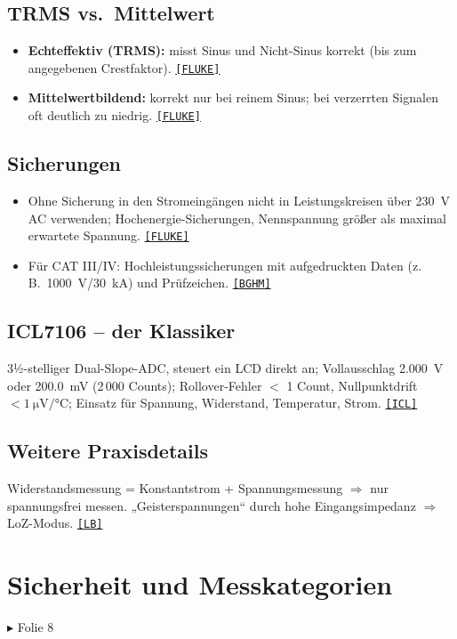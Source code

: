 \documentclass[11pt,a4paper]{article}
\newcommand{\q}[1]{\hyperlink{src:#1}{\textcolor{quelle}{\texttt{\footnotesize[#1]}}}}
\newcommand{\folie}[1]{\textcolor{akzent}{\footnotesize\textsf{$\blacktriangleright$ Folie #1}}}
\begin{document}
\subsection{TRMS vs.\ Mittelwert}\label{sec:trms}
\begin{itemize}
  \item \textbf{Echteffektiv (TRMS):} misst Sinus und Nicht-Sinus korrekt (bis zum angegebenen Crestfaktor). \q{FLUKE}
  \item \textbf{Mittelwertbildend:} korrekt nur bei reinem Sinus; bei verzerrten Signalen oft deutlich zu niedrig. \q{FLUKE}
\end{itemize}

\subsection{Sicherungen}
\begin{itemize}
  \item Ohne Sicherung in den Stromeingängen nicht in Leistungskreisen über \SI{230}{\volt} AC verwenden; Hochenergie-Sicherungen, Nennspannung größer als maximal erwartete Spannung. \q{FLUKE}
  \item Für CAT III/IV: Hochleistungssicherungen mit aufgedruckten Daten (z.\,B.\ \SI{1000}{\volt}/\SI{30}{\kilo\ampere}) und Prüfzeichen. \q{BGHM}
\end{itemize}

\subsection{ICL7106 -- der Klassiker}
3½-stelliger Dual-Slope-ADC, steuert ein LCD direkt an; Vollausschlag \SI{2.000}{\volt} oder \SI{200.0}{\milli\volt} (2\,000 Counts); Rollover-Fehler $<$ 1 Count, Nullpunktdrift $<\SI{1}{\micro\volt/\celsius}$; Einsatz für Spannung, Widerstand, Temperatur, Strom. \q{ICL}

\subsection{Weitere Praxisdetails}
Widerstandsmessung = Konstantstrom + Spannungsmessung $\Rightarrow$ nur spannungsfrei messen. „Geisterspannungen“ durch hohe Eingangsimpedanz $\Rightarrow$ LoZ-Modus. \q{LB}

\section{Sicherheit und Messkategorien}\label{sec:sicherheit}
\folie{8}
\end{document}
